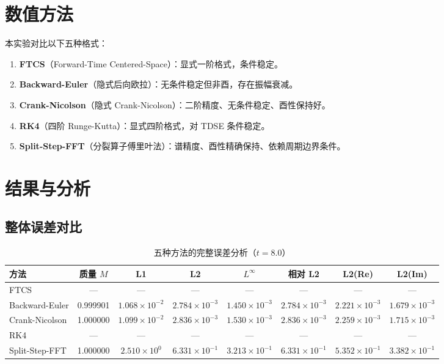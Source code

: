\documentclass[12pt, a4paper]{article}
\begin{document}
\section{数值方法}

本实验对比以下五种格式：

\begin{enumerate}
    \item \textbf{FTCS}（Forward-Time Centered-Space）：显式一阶格式，条件稳定。
    \item \textbf{Backward-Euler}（隐式后向欧拉）：无条件稳定但非酉，存在振幅衰减。
    \item \textbf{Crank-Nicolson}（隐式 Crank-Nicolson）：二阶精度、无条件稳定、酉性保持好。
    \item \textbf{RK4}（四阶 Runge-Kutta）：显式四阶格式，对 TDSE 条件稳定。
    \item \textbf{Split-Step-FFT}（分裂算子傅里叶法）：谱精度、酉性精确保持、依赖周期边界条件。
\end{enumerate}

\section{结果与分析}

\subsection{整体误差对比}

\begin{table}[H]
\centering
\caption{五种方法的完整误差分析（$t = 8.0$）}
\label{tab:error}
\begin{tabular}{lccccccc}
\toprule
\textbf{方法} & \textbf{质量} $M$ & \textbf{L1} & \textbf{L2} & \textbf{$L^\infty$} & \textbf{相对 L2} & \textbf{L2(Re)} & \textbf{L2(Im)} \\
\midrule
FTCS           & ---          & ---        & ---        & ---         & ---          & ---         & ---         \\
Backward-Euler & 0.999901     & $1.068\times 10^{-2}$ & $2.784\times 10^{-3}$ & $1.450\times 10^{-3}$ & $2.784\times 10^{-3}$ & $2.221\times 10^{-3}$ & $1.679\times 10^{-3}$ \\
Crank-Nicolson & 1.000000     & $1.099\times 10^{-2}$ & $2.836\times 10^{-3}$ & $1.530\times 10^{-3}$ & $2.836\times 10^{-3}$ & $2.259\times 10^{-3}$ & $1.715\times 10^{-3}$ \\
RK4            & ---          & ---        & ---        & ---         & ---          & ---         & ---         \\
Split-Step-FFT & 1.000000     & $2.510\times 10^{0}$  & $6.331\times 10^{-1}$ & $3.213\times 10^{-1}$ & $6.331\times 10^{-1}$ & $5.352\times 10^{-1}$ & $3.382\times 10^{-1}$ \\
\bottomrule
\end{tabular}
\end{table}
\end{document}
